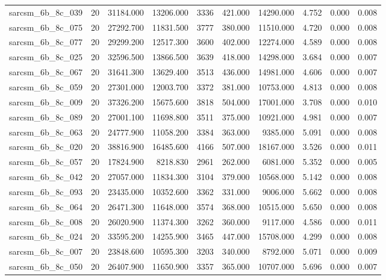 \begin{tabular}{lrrrrrrrrr}
sarcsm\_6b\_8c\_039 & 20 & 31184.000 & 13206.000 & 3336 & 421.000 & 14290.000 & 4.752 & 0.000 & 0.008 \\
sarcsm\_6b\_8c\_075 & 20 & 27292.700 & 11831.500 & 3777 & 380.000 & 11510.000 & 4.720 & 0.000 & 0.008 \\
sarcsm\_6b\_8c\_077 & 20 & 29299.200 & 12517.300 & 3600 & 402.000 & 12274.000 & 4.589 & 0.000 & 0.008 \\
sarcsm\_6b\_8c\_025 & 20 & 32596.500 & 13866.500 & 3639 & 418.000 & 14298.000 & 3.684 & 0.000 & 0.007 \\
sarcsm\_6b\_8c\_067 & 20 & 31641.300 & 13629.400 & 3513 & 436.000 & 14981.000 & 4.606 & 0.000 & 0.007 \\
sarcsm\_6b\_8c\_059 & 20 & 27301.000 & 12003.700 & 3372 & 381.000 & 10753.000 & 4.813 & 0.000 & 0.008 \\
sarcsm\_6b\_8c\_009 & 20 & 37326.200 & 15675.600 & 3818 & 504.000 & 17001.000 & 3.708 & 0.000 & 0.010 \\
sarcsm\_6b\_8c\_089 & 20 & 27001.100 & 11698.800 & 3511 & 375.000 & 10921.000 & 4.981 & 0.000 & 0.007 \\
sarcsm\_6b\_8c\_063 & 20 & 24777.900 & 11058.200 & 3384 & 363.000 & 9385.000 & 5.091 & 0.000 & 0.008 \\
sarcsm\_6b\_8c\_020 & 20 & 38816.900 & 16485.600 & 4166 & 507.000 & 18167.000 & 3.526 & 0.000 & 0.011 \\
sarcsm\_6b\_8c\_057 & 20 & 17824.900 & 8218.830 & 2961 & 262.000 & 6081.000 & 5.352 & 0.000 & 0.005 \\
sarcsm\_6b\_8c\_042 & 20 & 27057.000 & 11834.300 & 3104 & 379.000 & 10568.000 & 5.142 & 0.000 & 0.008 \\
sarcsm\_6b\_8c\_093 & 20 & 23435.000 & 10352.600 & 3362 & 331.000 & 9006.000 & 5.662 & 0.000 & 0.008 \\
sarcsm\_6b\_8c\_064 & 20 & 26471.300 & 11648.000 & 3574 & 368.000 & 10515.000 & 5.650 & 0.000 & 0.008 \\
sarcsm\_6b\_8c\_008 & 20 & 26020.900 & 11374.300 & 3262 & 360.000 & 9117.000 & 4.586 & 0.000 & 0.011 \\
sarcsm\_6b\_8c\_024 & 20 & 33595.200 & 14255.900 & 3465 & 447.000 & 15708.000 & 4.299 & 0.000 & 0.008 \\
sarcsm\_6b\_8c\_007 & 20 & 23848.600 & 10595.300 & 3203 & 340.000 & 8792.000 & 5.071 & 0.000 & 0.009 \\
sarcsm\_6b\_8c\_050 & 20 & 26407.900 & 11650.900 & 3357 & 365.000 & 10707.000 & 5.696 & 0.000 & 0.007 \\

\end{tabular}
